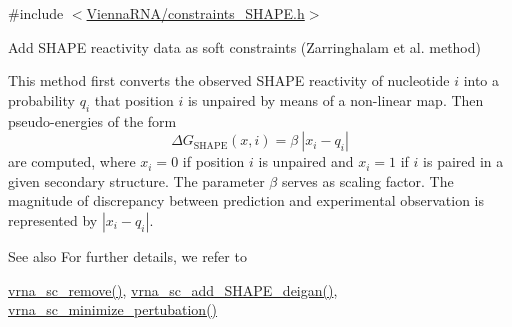{\ttfamily \#include $<$\hyperlink{constraints__SHAPE_8h}{Vienna\+R\+N\+A/constraints\+\_\+\+S\+H\+A\+P\+E.\+h}$>$}



Add S\+H\+A\+PE reactivity data as soft constraints (Zarringhalam et al. method) 

This method first converts the observed S\+H\+A\+PE reactivity of nucleotide $ i $ into a probability $ q_i $ that position $ i $ is unpaired by means of a non-\/linear map. Then pseudo-\/energies of the form \[ \Delta G_{\text{SHAPE}}(x,i) = \beta\ |x_i - q_i| \] are computed, where $ x_i=0 $ if position $ i $ is unpaired and $ x_i=1 $ if $ i $ is paired in a given secondary structure. The parameter $ \beta $ serves as scaling factor. The magnitude of discrepancy between prediction and experimental observation is represented by $ |x_i - q_i| $.

\begin{DoxySeeAlso}{See also}
For further details, we refer to \cite{zarringhalam:2012} 

\hyperlink{group__soft__constraints_ga73cdc07b9a199c614367bebef0f2c41a}{vrna\+\_\+sc\+\_\+remove()}, \hyperlink{group__SHAPE__reactivities_ga57d612b58e1c61dd6cfcb5a843f8f1b3}{vrna\+\_\+sc\+\_\+add\+\_\+\+S\+H\+A\+P\+E\+\_\+deigan()}, \hyperlink{group__perturbation_gaa124bdc20d88001c38ade590c4bcc3c4}{vrna\+\_\+sc\+\_\+minimize\+\_\+pertubation()}
\end{DoxySeeAlso}

